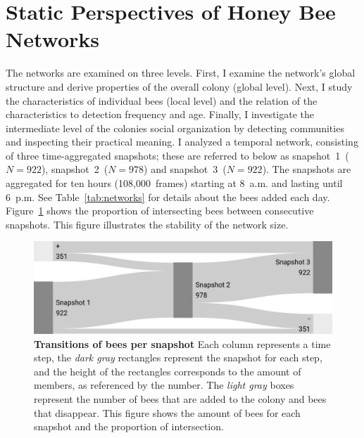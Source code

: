 \section{Static Perspectives of Honey Bee Networks}
\label{sec:staticResults}
The networks are examined on three levels.
First, I examine the network's global structure and derive properties of the overall colony (global level).
Next, I study the characteristics of individual bees (local level) and the relation of the characteristics to detection frequency and age.
Finally, I investigate the intermediate level of the colonies social organization by detecting communities and inspecting their practical meaning.
I analyzed a temporal network, consisting of three time-aggregated snapshots; these are referred to below as snapshot~1~($N = 922$), snapshot~2~($N = 978$) and snapshot~3~($N = 922$).
The snapshots are aggregated for ten hours (108,000~frames) starting at 8~a.m. and lasting until 6~p.m.
See Table~\ref{tab:networks} for details about the bees added each day. Figure~\ref{fig:network-matching} shows the proportion of intersecting bees between consecutive snapshots.
This figure illustrates the stability of the network size.




\begin{figure}[htb]
	\centering
	\includegraphics[width=1.0\textwidth]{Figures/network_matching}
	\caption[Transitions of bees per snapshot]{
	\textbf{Transitions of bees per snapshot}
	Each column represents a time step, the \emph{dark gray} rectangles represent the snapshot for each step, and the height of the rectangles corresponds to the amount of members, as referenced by the number.
	The \emph{light gray} boxes represent the number of bees that are added to the colony and bees that disappear.
	This figure shows the amount of bees for each snapshot and the proportion of intersection.}
	\label{fig:network-matching}
\end{figure}





